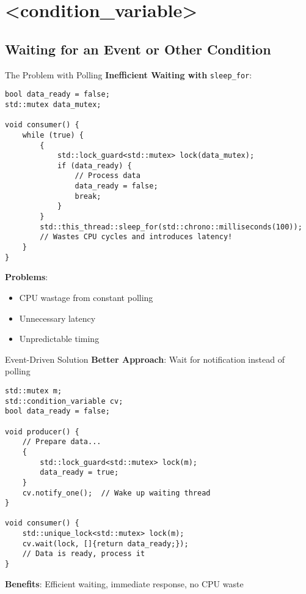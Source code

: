 \section{<condition\_variable>}

\subsection{Waiting for an Event or Other Condition}
\begin{frame}[fragile]{The Problem with Polling}
	\textbf{Inefficient Waiting with} \texttt{sleep\_for}:

	\begin{verbatim}
bool data_ready = false;
std::mutex data_mutex;

void consumer() {
    while (true) {
        {
            std::lock_guard<std::mutex> lock(data_mutex);
            if (data_ready) {
                // Process data
                data_ready = false;
                break;
            }
        }
        std::this_thread::sleep_for(std::chrono::milliseconds(100));
        // Wastes CPU cycles and introduces latency!
    }
}
	\end{verbatim}

	\textbf{Problems}:
	\begin{itemize}
		\item CPU wastage from constant polling
		\item Unnecessary latency
		\item Unpredictable timing
	\end{itemize}
\end{frame}

\begin{frame}[fragile]{Event-Driven Solution}
	\textbf{Better Approach}: Wait for notification instead of polling

	\begin{verbatim}
std::mutex m;
std::condition_variable cv;
bool data_ready = false;

void producer() {
    // Prepare data...
    {
        std::lock_guard<std::mutex> lock(m);
        data_ready = true;
    }
    cv.notify_one();  // Wake up waiting thread
}

void consumer() {
    std::unique_lock<std::mutex> lock(m);
    cv.wait(lock, []{return data_ready;});
    // Data is ready, process it
}
	\end{verbatim}

	\textbf{Benefits}: Efficient waiting, immediate response, no CPU waste
\end{frame}

